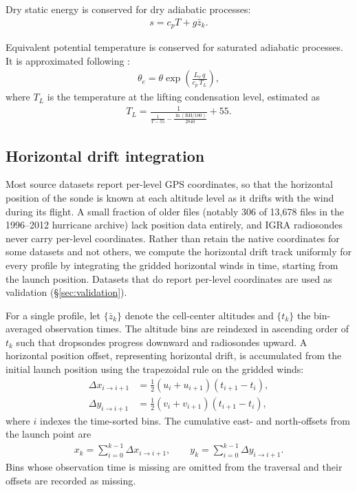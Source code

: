 \documentclass[11pt]{article}
\begin{document}
Dry static energy is conserved for dry adiabatic processes:
\begin{align}
    s = c_p T + g\bar{z}_k. \label{eq:DSE}
\end{align}


Equivalent potential temperature is conserved for saturated adiabatic processes.  It is approximated following \citet{bolton1980}:
\begin{align}
    \theta_e = \theta \exp\!\left(\frac{L_v\, q}{c_p\, T_L}\right), \label{eq:theta_e}
\end{align}
where $T_L$ is the temperature at the lifting condensation level, estimated as
\begin{align}
    T_L = \frac{1}{\displaystyle\frac{1}{T - 55} - \frac{\ln(\mathrm{RH}/100)}{2840}} + 55. \label{eq:TL}
\end{align}

\subsection{Horizontal drift integration} \label{sec:drift}

Most source datasets report per-level GPS coordinates, so that the horizontal position of the sonde is known at each altitude level as it drifts with the wind during its flight.  A small fraction of older files (notably 306 of 13{,}678 files in the 1996--2012 hurricane archive) lack position data entirely, and IGRA radiosondes never carry per-level coordinates.  Rather than retain the native coordinates for some datasets and not others, we compute the horizontal drift track uniformly for every profile by integrating the gridded horizontal winds in time, starting from the launch position. Datasets that do report per-level coordinates are used as validation (\S\ref{sec:validation}).

For a single profile, let $\{\bar{z}_k\}$ denote the cell-center altitudes and $\{t_k\}$ the bin-averaged observation times.  The altitude bins are reindexed in ascending order of $t_k$ such that dropsondes progress downward and radiosondes upward.  A horizontal position offset, representing horizontal drift, is accumulated from the initial launch position using the trapezoidal rule on the gridded winds:
\begin{align}
    \Delta x_{i \to i+1} &= \tfrac{1}{2}\left(u_i + u_{i+1}\right)\left(t_{i+1} - t_i\right), \label{eq:dx} \\
    \Delta y_{i \to i+1} &= \tfrac{1}{2}\left(v_i + v_{i+1}\right)\left(t_{i+1} - t_i\right), \label{eq:dy}
\end{align}
where $i$ indexes the time-sorted bins.  The cumulative east- and north-offsets from the launch point are
\begin{align}
    x_k = \sum_{i=0}^{k-1} \Delta x_{i \to i+1}, \qquad y_k = \sum_{i=0}^{k-1} \Delta y_{i \to i+1}.
\end{align}
Bins whose observation time is missing are omitted from the traversal and their offsets are recorded as missing.
\end{document}
